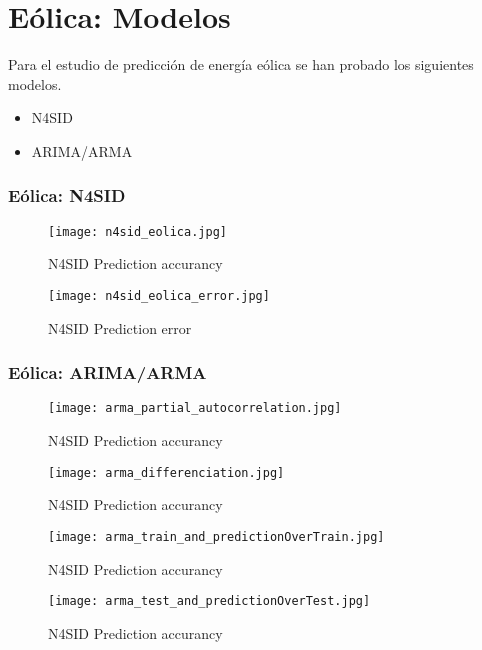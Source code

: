 \section{Eólica: Modelos}
\label{sub:Modelos}

Para el estudio de predicción de energía eólica se han probado los siguientes modelos.

\begin{itemize}
    \item N4SID
    \item ARIMA/ARMA
\end{itemize}

\subsubsection{Eólica: N4SID} %
\label{ssub:eólica_n4sid}


\begin{figure}[h]
    \texttt{[image: n4sid\_eolica.jpg]}
    \caption{N4SID Prediction accurancy}
\end{figure}

\begin{figure}[h]
    \texttt{[image: n4sid\_eolica\_error.jpg]}
    \caption{N4SID Prediction error}
\end{figure}


\subsubsection{Eólica: ARIMA/ARMA} %
\label{ssub:eólica_arima_arma}

\begin{figure}[h]
    \texttt{[image: arma\_partial\_autocorrelation.jpg]}
    \caption{N4SID Prediction accurancy}
\end{figure}
\begin{figure}[h]
    \texttt{[image: arma\_differenciation.jpg]}
    \caption{N4SID Prediction accurancy}
\end{figure}
\begin{figure}[h]
    \texttt{[image: arma\_train\_and\_predictionOverTrain.jpg]}
    \caption{N4SID Prediction accurancy}
\end{figure}
\begin{figure}[h]
    \texttt{[image: arma\_test\_and\_predictionOverTest.jpg]}
    \caption{N4SID Prediction accurancy}
\end{figure}